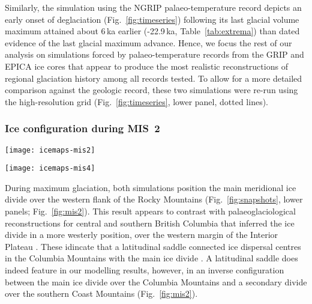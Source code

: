 \documentclass[tc]{copernicus}
\begin{document}
Similarly, the simulation using the NGRIP palaeo-temperature record depicts an
early onset of deglaciation (Fig.~\ref{fig:timeseries}) following its last
glacial volume maximum attained about 6\,ka earlier (-22.9\,ka,
Table~\ref{tab:extrema}) than dated evidence of the last glacial maximum
advance. Hence, we focus the rest of our analysis on simulations forced by
palaeo-temperature records from the GRIP and EPICA ice cores that appear to
produce the most realistic reconstructions of regional glaciation history among
all records tested. To allow for a more
detailed comparison against the geologic record, these two simulations were
re-run using the high-resolution grid (Fig.~\ref{fig:timeseries}, lower panel,
dotted lines).


\subsubsection{Ice configuration during MIS~2}
\label{sec:mis2}

\begin{figure*}
  \texttt{[image: icemaps-mis2]}
  \caption{Modelled surface topography (200\,m contours) and surface velocity
           (colour mapping) corresponding to the maximum ice volume during
           MIS~2 in the GRIP and EPICA high-resolution simulations.}
  \label{fig:mis2}
\end{figure*}

\begin{figure*}
  \texttt{[image: icemaps-mis4]}
  \caption{Modelled surface topography (200\,m contours) and surface velocity
           (colour mapping) corresponding to the maximum ice volume during
           MIS~4 in the GRIP and EPICA high-resolution simulations.}
  \label{fig:mis4}
\end{figure*}

During maximum glaciation, both simulations position the main meridional ice
divide over
the western flank of the Rocky Mountains (Fig.~\ref{fig:snapshots}, lower
panels; Fig.~\ref{fig:mis2}). This result appears to contrast with
palaeoglaciological reconstructions for central and southern British Columbia
that inferred the ice divide in a more westerly position,
over the western margin of the Interior Plateau \citep{Ryder.etal.1991,
Stumpf.etal.2000, Kleman.etal.2010, Clague.Ward.2011, Margold.etal.2013a}.
These idincate that a latitudinal saddle connected ice dispersal centres in
the Columbia Mountains with the main ice divide \citep{Ryder.etal.1991,
Kleman.etal.2010, Clague.Ward.2011, Margold.etal.2013a}. A latitudinal saddle
does indeed feature in our modelling results, however, in an inverse
configuration between the main ice divide over the Columbia Mountains and a
secondary divide over the southern Coast Mountains (Fig.~\ref{fig:mis2}).
\end{document}
